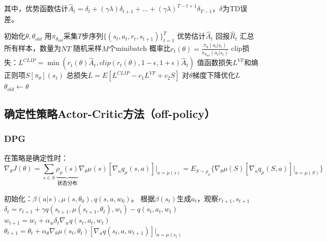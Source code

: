 \documentclass[
12pt, %
a4paper, 
oneside, %
]{scrartcl}
\begin{document}
其中，优势函数估计$ \hat{A}_t = \delta_t + (\gamma\lambda)\delta_{t + 1} + \dots + (\gamma\lambda)^{T - t + 1}\delta_{T - 1} $，$ \delta $为TD误差。
\begin{myalgorithm}[PPO]
\State 初始化$ \theta, \theta_{old} $
\State 用$ \pi_{\theta_{old}} $采集$ T $步序列$ \{(s_t, a_t, r_t, s_{t + 1})\}_{t = 1}^T $
\State 优势估计$ \hat{A}_t $
\State 回报$ \hat{R}_t $
\EndFor
\State 汇总所有样本，数量为$ NT $
\State 随机采样$ M $个minibatch
\State 概率比$ r_t(\theta) = \frac{\pi_\theta(a_t|s_t)}{\pi_{\theta_{old}}(a_t|s_t)} $
\State clip损失：$ L^{CLIP} = \min(r_t(\theta)\hat{A}_t, clip(r_t(\theta), 1 - \epsilon, 1 + \epsilon)\hat{A}_t) $
\State 值函数损失$ L^{VF} $和熵正则项$ S[\pi_\theta](s_t) $
\State 总损失$ L = E[L^{CLIP} - c_1 L^{VF} + c_2 S] $
\State 对$ \theta $梯度下降优化$ L $
\EndFor
\State $ \theta_{old} \gets \theta $
\EndFor
\end{myalgorithm}
\subsection[确定性策略Actor-Critic方法]{确定性策略Actor-Critic方法（off-policy）}
\subsubsection[DPG]{DPG}
在策略是确定性时：
$$ \nabla_\theta J(\theta) = \sum_{s \in S} \underbrace{\rho_\mu(s)}_{\text{状态分布}} \nabla_\theta \mu(s)[\nabla_a q_\mu(s, a)]\bigg|_{a = \mu(s)} = E_{S \sim \rho_\mu}\{\nabla_\theta \mu(S)[\nabla_a q_\mu(S, a)]\bigg|_{a = \mu(S)}\} $$
\begin{myalgorithm}[DPG]
\State 初始化：$ \beta(a|s), \mu(s, \theta_0), q(s, a, w_0) $。
\State 根据$ \beta(s_t) $生成$ a_t $，观察$ r_{t + 1}, s_{t + 1} $
\State $ \delta_t = r_{t + 1} + \gamma q(s_{t + 1}, \mu(s_{t + 1}, \theta_t), w_t) - q(s_t, a_t, w_t) $ 
\State $ w_{t + 1} = w_t + \alpha_w \delta_t \nabla_w q(s_t, a_t, w_t) $ 
\State $ \theta_{t + 1} = \theta_t + \alpha_\theta \nabla_\theta \mu(s_t, \theta_t)[\nabla_a q(s_t, a, w_{t + 1})]|_{a = \mu(s_t)} $ 
\EndFor
\EndFor
\end{myalgorithm}
\end{document}
